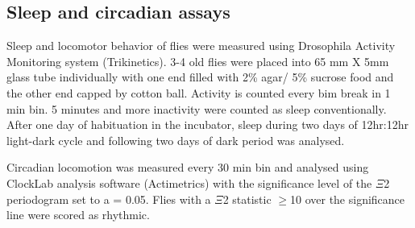 \subsection*{Sleep and circadian assays}

Sleep and locomotor behavior of flies were measured using Drosophila Activity Monitoring system (Trikinetics).
3-4 old flies were placed into 65 mm X 5mm glass tube individually with one end filled with 2\% agar/ 5\% sucrose food and the other end capped by cotton ball.
Activity is counted every bim break in 1 min bin.
5 minutes and more inactivity were counted as sleep conventionally.
After one day of habituation in the incubator, sleep during two days of 12hr:12hr light-dark cycle and following two days of dark period was analysed.

Circadian locomotion was measured every 30 min bin and analysed using ClockLab analysis software (Actimetrics) with the significance level of the $\Xi$2 periodogram set to a = 0.05.
Flies with a $\Xi$2 statistic $\geq$10 over the significance line were scored as rhythmic.
    
  